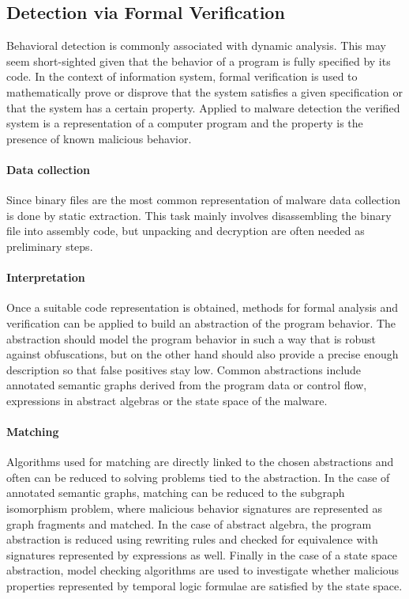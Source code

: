 \subsection{Detection via Formal Verification}
Behavioral detection is commonly associated with dynamic analysis. This may seem short-sighted given that the behavior of a program is fully specified by its code. In the context of information system, formal verification is used to mathematically prove or disprove that the system satisfies a given specification or that the system has a certain property. Applied to malware detection the verified system is a representation of a computer program and the property is the presence of known malicious behavior.

\paragraph*{Data collection} Since binary files are the most common representation of malware data collection is done by static extraction. This task mainly involves disassembling the binary file into assembly code, but unpacking and decryption are often needed as preliminary steps.

\paragraph*{Interpretation} Once a suitable code representation is obtained, methods for formal analysis and verification can be applied to build an abstraction of the program behavior. The abstraction should model the program behavior in such a way that is robust against obfuscations, but on the other hand should also provide a precise enough description so that false positives stay low. Common abstractions include annotated semantic graphs derived from the program data or control flow, expressions in abstract algebras or the state space of the malware.

\paragraph*{Matching} Algorithms used for matching are directly linked to the chosen abstractions and often can be reduced to solving problems tied to the abstraction. In the case of annotated semantic graphs, matching can be reduced to the subgraph isomorphism problem, where malicious behavior signatures are represented as graph fragments and matched. In the case of abstract algebra, the program abstraction is reduced using rewriting rules and checked for equivalence with signatures represented by expressions as well. Finally in the case of a state space abstraction, model checking algorithms are used to investigate whether malicious properties represented by temporal logic formulae are satisfied by the state space.

